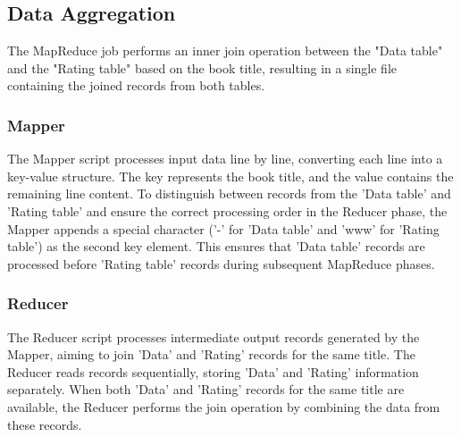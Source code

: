 \subsection*{Data Aggregation}

The MapReduce job performs an inner join operation between the "Data table" and the "Rating table" based on the book title,
resulting in a single file containing the joined records from both tables.

\subsubsection*{Mapper}

The Mapper script processes input data line by line, converting each line into a key-value structure.
The key represents the book title, and the value contains the remaining line content.
To distinguish between records from the 'Data table' and 'Rating table'
and ensure the correct processing order in the Reducer phase, the Mapper appends
a special character ('-' for 'Data table' and 'www' for 'Rating table') as the second key element.
This ensures that 'Data table' records are processed before 'Rating table' records during subsequent MapReduce phases.

\subsubsection*{Reducer}

The Reducer script processes intermediate output records generated by the Mapper,
aiming to join 'Data' and 'Rating' records for the same title.
The Reducer reads records sequentially, storing 'Data' and 'Rating' information separately.
When both 'Data' and 'Rating' records for the same title are available,
the Reducer performs the join operation by combining the data from these records.
